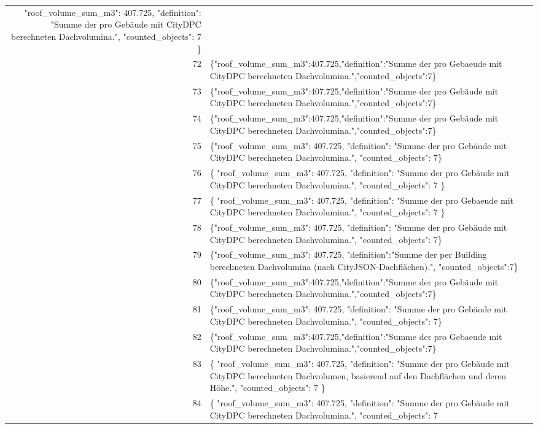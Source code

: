 \documentclass[a4paper,11pt]{article}
\begin{document}
\begin{table}[ht]
\begin{tabular}{r p{12cm}}
  "roof\_volume\_sum\_m3": 407.725,
  "definition": "Summe der pro Gebäude mit CityDPC berechneten Dachvolumina.",
  "counted\_objects": 7
\} \\
72 & \{"roof\_volume\_sum\_m3":407.725,"definition":"Summe der pro Gebaeude mit CityDPC berechneten Dachvolumina.","counted\_objects":7\} \\
73 & \{"roof\_volume\_sum\_m3":407.725,"definition":"Summe der pro Gebäude mit CityDPC berechneten Dachvolumina.","counted\_objects":7\} \\
74 & \{"roof\_volume\_sum\_m3":407.725,"definition":"Summe der pro Gebäude mit CityDPC berechneten Dachvolumina.","counted\_objects":7\} \\
75 & \{"roof\_volume\_sum\_m3": 407.725, "definition": "Summe der pro Gebäude mit CityDPC berechneten Dachvolumina.", "counted\_objects": 7\} \\
76 & \{
  "roof\_volume\_sum\_m3": 407.725,
  "definition": "Summe der pro Gebäude mit CityDPC berechneten Dachvolumina.",
  "counted\_objects": 7
\} \\
77 & \{
  "roof\_volume\_sum\_m3": 407.725,
  "definition": "Summe der pro Gebaeude mit CityDPC berechneten Dachvolumina.",
  "counted\_objects": 7
\} \\
78 & \{"roof\_volume\_sum\_m3": 407.725, "definition": "Summe der pro Gebäude mit CityDPC berechneten Dachvolumina.", "counted\_objects": 7\} \\
79 & \{"roof\_volume\_sum\_m3": 407.725, "definition":"Summe der per Building berechneten Dachvolumina (nach CityJSON-Dachflächen).", "counted\_objects":7\} \\
80 & \{"roof\_volume\_sum\_m3":407.725,"definition":"Summe der pro Gebäude mit CityDPC berechneten Dachvolumina.","counted\_objects":7\} \\
81 & \{"roof\_volume\_sum\_m3": 407.725, "definition": "Summe der pro Gebäude mit CityDPC berechneten Dachvolumina.", "counted\_objects": 7\} \\
82 & \{"roof\_volume\_sum\_m3":407.725,"definition":"Summe der pro Gebaeude mit CityDPC berechneten Dachvolumina.","counted\_objects":7\} \\
83 & \{
  "roof\_volume\_sum\_m3": 407.725,
  "definition": "Summe der pro Gebäude mit CityDPC berechneten Dachvolumen, basierend auf den Dachflächen und deren Höhe.",
  "counted\_objects": 7
\} \\
84 & \{
  "roof\_volume\_sum\_m3": 407.725,
  "definition": "Summe der pro Gebäude mit CityDPC berechneten Dachvolumina.",
  "counted\_objects": 7

\end{tabular}
\end{table}
\end{document}
